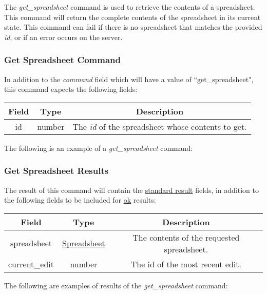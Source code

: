 The \emph{get\_spreadsheet} command is used to retrieve the contents of a 
spreadsheet. This command will return the complete contents of the 
spreadsheet in its current state. This command can fail if there is no 
spreadsheet that matches the provided \emph{id}, or if an error occurs on the 
server.

\subsubsection{Get Spreadsheet Command}
In addition to the \emph{command} field which will have a value of ``get\_spreadsheet", this command expects the following fields:
\begin{table}[H]
    \begin{center}
        \begin{tabular}{|c|c|c|}\hline
            Field & Type & Description \\\hline
            id & number & The \emph{id} of the spreadsheet whose contents to get. \\\hline
        \end{tabular}
    \end{center}
\end{table}

The following is an example of a \emph{get\_spreadsheet} command:


\subsubsection{Get Spreadsheet Results}
The result of this command will contain the \hyperref[sec:message:result]{standard result} fields, in addition to the following fields to be included for \underline{ok} results:
\begin{table}[H]
    \begin{center}
        \begin{tabular}{|c|c|c|}\hline
            Field & Type & Description \\\hline
            spreadsheet & \hyperref[sec:message:spreadsheet]{Spreadsheet} & The contents of the requested spreadsheet. \\\hline
            current\_edit & number & The id of the most recent edit. \\\hline
        \end{tabular}
    \end{center}
\end{table}

The following are examples of results of the \emph{get\_spreadsheet} command:




